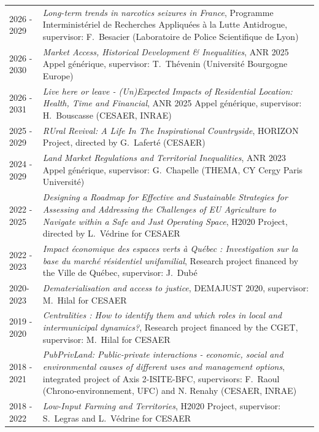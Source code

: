 \documentclass[a4paper,12pt]{article}
\begin{document}
\noindent \begin{longtable}{@{}p{\annee}p{\texte}@{}}
2026 - 2029 & \og{}\textit{Long-term trends in narcotics seizures in France}\fg{}, Programme Interministériel de Recherches Appliquées à la Lutte Antidrogue, supervisor: F.~Besacier (Laboratoire de Police Scientifique de Lyon) \\
2026 - 2030 & \og{}\textit{Market Access, Historical Development \& Inequalities}\fg{}, ANR 2025 Appel générique, supervisor: T.~Thévenin (Université Bourgogne Europe) \\
2026 - 2031 & \og{}\textit{Live here or leave - (Un)Expected Impacts of Residential Location: Health, Time and Financial}\fg{}, ANR 2025 Appel générique, supervisor: H.~Bouscasse (CESAER, INRAE) \\
2025 - 2029 & \og{}\textit{RUral Revival: A Life In The Inspirational Countryside}\fg{}, HORIZON Project, directed by G.~Laferté (CESAER) \\
2024 - 2029 & \og{}\textit{Land Market Regulations and Territorial Inequalities}\fg{}, ANR 2023 Appel générique, supervisor: G.~Chapelle (THEMA, CY Cergy Paris Université) \\
2022 - 2025 & \og{}\textit{Designing a Roadmap for Effective and Sustainable Strategies for Assessing and Addressing the Challenges of EU Agriculture to Navigate within a Safe and Just Operating Space}\fg{}, H2020 Project, directed by L.~Védrine for CESAER \\
2022 - 2023 & \og{}\textit{Impact économique des espaces verts à Québec : Investigation sur la base du marché résidentiel unifamilial}\fg{}, Research project financed by the Ville de Québec, supervisor: J.~Dubé \\
2020- 2023 & \og{}\textit{Dematerialisation and access to justice}\fg{}, DEMAJUST 2020, supervisor: M.~Hilal for CESAER \\
2019 - 2020 & \og{}\textit{Centralities : How to identify them and which roles in local and intermunicipal dynamics?}\fg{}, Research project financed by the CGET, supervisor: M.~Hilal for CESAER \\
2018 - 2021 & \og{}\textit{PubPrivLand: Public-private interactions - economic, social and environmental causes of different uses and management options}\fg{}, integrated project  of Axis 2-ISITE-BFC, supervisors: F.~Raoul (Chrono-environnement, UFC) and N. Renahy (CESAER, INRAE) \\
2018 - 2022 & \og{}\textit{Low-Input Farming and Territories}\fg{}, H2020 Project, supervisor: S.~Legras and L.~Védrine for CESAER \\

\end{longtable}
\end{document}
